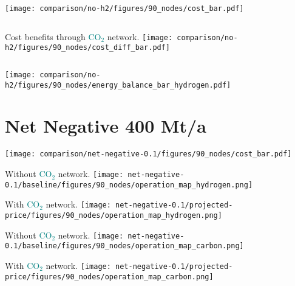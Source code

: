 \documentclass[12pt, aspectratio=169]{beamer}
\newcommand{\carbon}{\textcolor{teal}{CO$_2$}}
\begin{document}
\begin{frame}
    \texttt{[image: comparison/no-h2/figures/90\_nodes/cost\_bar.pdf]}
\end{frame}

\begin{frame}
    \begin{columns}
        Cost benefits through \carbon{} network.
        \texttt{[image: comparison/no-h2/figures/90\_nodes/cost\_diff\_bar.pdf]}
    \end{columns}
\end{frame}


\begin{frame}
    \texttt{[image: comparison/no-h2/figures/90\_nodes/energy\_balance\_bar\_hydrogen.pdf]}
\end{frame}


\section{Net Negative 400 Mt/a}

\begin{frame}
    \texttt{[image: comparison/net-negative-0.1/figures/90\_nodes/cost\_bar.pdf]}
\end{frame}


\begin{frame}
    \begin{center}
    Without \carbon{} network.
    \texttt{[image: net-negative-0.1/baseline/figures/90\_nodes/operation\_map\_hydrogen.png]}
    \end{center}
\end{frame}


\begin{frame}
    \begin{center}
    With \carbon{} network.
    \texttt{[image: net-negative-0.1/projected-price/figures/90\_nodes/operation\_map\_hydrogen.png]}
    \end{center}
\end{frame}


\begin{frame}
    \begin{center}
    Without \carbon{} network.
    \texttt{[image: net-negative-0.1/baseline/figures/90\_nodes/operation\_map\_carbon.png]}
    \end{center}
\end{frame}


\begin{frame}
    \begin{center}
    With \carbon{} network.
    \texttt{[image: net-negative-0.1/projected-price/figures/90\_nodes/operation\_map\_carbon.png]}
    \end{center}
\end{frame}
\end{document}
